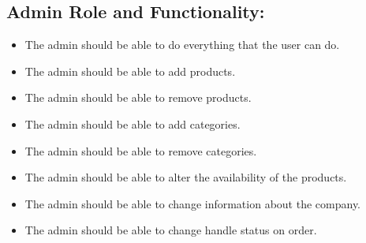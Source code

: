 \subsection{Admin Role and Functionality:}

\begin{itemize}
    \item The admin should be able to do everything that the user can do.
    \item The admin should be able to add products.
    \item The admin should be able to remove products. 
    \item The admin should be able to add categories. 
    \item The admin should be able to remove categories. 
    \item The admin should be able to alter the availability of the products. 
    \item The admin should be able to change information about the company.
    \item The admin should be able to change handle status on order.
\end{itemize}



